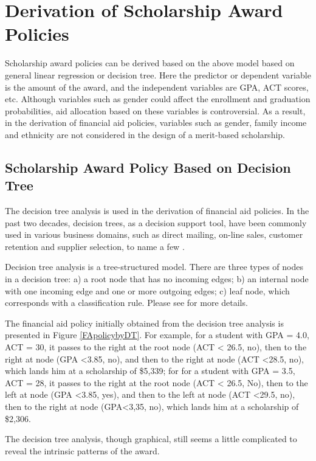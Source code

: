 \documentclass[12pt,english]{report}
\begin{document}
\section{Derivation of Scholarship Award Policies}
Scholarship award policies can be derived based on the above model based on general linear regression or decision tree.  Here the predictor or dependent variable is the amount of the award, and the independent variables are GPA, ACT scores, etc.  Although variables such as gender could affect the enrollment and graduation probabilities,  aid allocation based on these variables is controversial. 
As a result, in the derivation of financial aid policies, variables such as gender, family income and ethnicity are not considered in the design of a merit-based scholarship.

\subsection{Scholarship Award Policy Based on Decision Tree }

The decision tree analysis is used in the derivation of  financial aid policies.  In the past two decades, decision trees, as a decision support tool, have been commonly used in various business domains, such as direct mailing, on-line sales, customer retention and supplier selection, to name a few \citep{Han2011}.

Decision tree analysis is a tree-structured model. There are three types of nodes in a decision tree: a) a root node that has no incoming edges; b) an internal node with one incoming edge and one or more outgoing edges; c) leaf node, which corresponds with a classification rule. Please see \citep{Maimon2005} for more details.

The financial aid policy initially obtained from the decision tree analysis is presented in Figure \ref{FApolicybyDT}.  For example, for a student with GPA = 4.0, ACT = 30, it passes to the right at the root node (ACT < 26.5, no),  then to the right at node (GPA <3.85, no), and then to the right at node (ACT <28.5, no),  which lands him at a scholarship of \$5,339;   for  for a student with GPA = 3.5, ACT = 28, it passes to the right at the root node (ACT < 26.5, No), then to the left at node (GPA <3.85, yes), and then to the left at node (ACT <29.5, no), then to the right at node (GPA<3,35, no), which lands him at a scholarship of \$2,306.

The decision tree analysis, though graphical, still seems a little complicated to reveal the intrinsic patterns of the award. 
\end{document}
